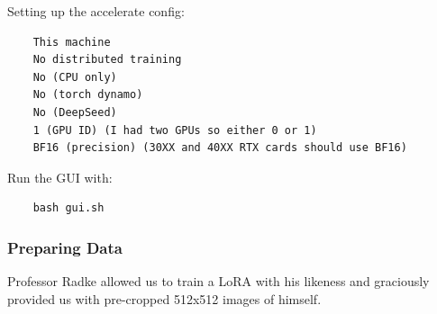 \documentclass{article}
\begin{document}
\newpage
Setting up the accelerate config:
\begin{verbatim}
    This machine
    No distributed training
    No (CPU only)
    No (torch dynamo)
    No (DeepSeed)
    1 (GPU ID) (I had two GPUs so either 0 or 1)
    BF16 (precision) (30XX and 40XX RTX cards should use BF16)
\end{verbatim}
Run the GUI with:
\begin{verbatim}
    bash gui.sh
\end{verbatim}

\subsubsection{Preparing Data}
Professor Radke allowed us to train a LoRA with his likeness and graciously provided us with pre-cropped 512x512 images of himself.
\end{document}
